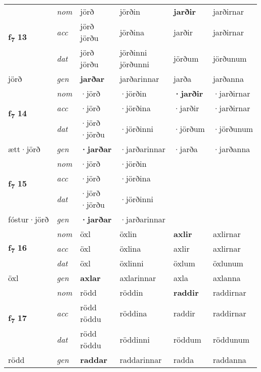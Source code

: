 \begin{longtable}[l]{X>{\footnotesize\itshape}XXXXX}
\multirow{3}{*}{{{\textbf{f{\textsubscript{7}}} \Large{\textbf{13}}}}} & nom & jörð & jörðin & \textbf{jarðir} & jarðirnar \\*
 & acc & \specialcell{jörð\\ jörðu} & jörðina & jarðir & jarðirnar \\*
 & dat & \specialcell{jörð\\ jörðu} & \specialcell{jörðinni\\ jörðunni} & jörðum & jörðunum \\*
 {\footnotesize{jörð}} & gen & \textbf{jarðar} & jarðarinnar & jarða & jarðanna \\
\cmidrule{1-6}

\multirow{3}{*}{{{\textbf{f{\textsubscript{7}}} \Large{\textbf{14}}}}} & nom & ·jörð & ·jörðin & \textbf{·jarðir} & ·jarðirnar \\*
 & acc & ·jörð & ·jörðina & ·jarðir & ·jarðirnar \\*
 & dat & \specialcell{·jörð\\  ·jörðu} & ·jörðinni & ·jörðum & ·jörðunum \\*
 {\footnotesize{ætt\allowbreak ·jörð}} & gen & \textbf{·jarðar} & ·jarðarinnar & ·jarða & ·jarðanna \\
\cmidrule{1-6}

\multirow{3}{*}{{{\textbf{f{\textsubscript{7}}} \Large{\textbf{15}}}}} & nom & ·jörð & ·jörðin & \textbf{} &  \\*
 & acc & ·jörð & ·jörðina &  &  \\*
 & dat & \specialcell{·jörð\\  ·jörðu} & ·jörðinni &  &  \\*
 {\footnotesize{fóstur\allowbreak ·jörð}} & gen & \textbf{·jarðar} & ·jarðarinnar &  &  \\
\cmidrule{1-6}

\multirow{3}{*}{{{\textbf{f{\textsubscript{7}}} \Large{\textbf{16}}}}} & nom & öxl & öxlin & \textbf{axlir} & axlirnar \\*
 & acc & öxl & öxlina & axlir & axlirnar \\*
 & dat & öxl & öxlinni & öxlum & öxlunum \\*
 {\footnotesize{öxl}} & gen & \textbf{axlar} & axlarinnar & axla & axlanna \\
\cmidrule{1-6}

\multirow{3}{*}{{{\textbf{f{\textsubscript{7}}} \Large{\textbf{17}}}}} & nom & rödd & röddin & \textbf{raddir} & raddirnar \\*
 & acc & \specialcell{rödd\\ röddu} & röddina & raddir & raddirnar \\*
 & dat & \specialcell{rödd\\ röddu} & röddinni & röddum & röddunum \\*
 {\footnotesize{rödd}} & gen & \textbf{raddar} & raddarinnar & radda & raddanna \\
\cmidrule{1-6}


\end{longtable}
